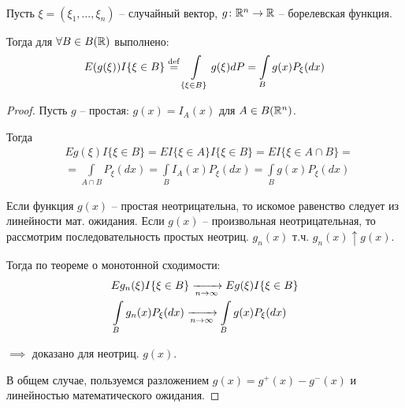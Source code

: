 \begin{theorem}~

  Пусть $\xi = (\xi_1, \ldots, \xi_n)$ -- случайный вектор, 
  $g\colon \mathbb{R}^n \to \mathbb{R}$ -- борелевская функция. 

  Тогда для $\forall B \in B(\mathbb{R})$ выполнено:
  \begin{align*}
    E(g(\xi)) I\{ \xi \in B \} \stackrel{\mathrm{def}}{=} \int\limits_{\{ \xi \in B \}} g(\xi) dP = 
    \int\limits_B g(x) P_{\xi} (dx)
  \end{align*}

  \begin{proof}
    Пусть $g$ -- простая: $g(x) = I_{A}(x)$ для $A \in B(\mathbb{R}^n)$.

    Тогда
    \begin{align*}
      &E g(\xi) I \{ \xi \in B \} = E I \{ \xi \in A \} I \{ \xi \in B \} =
      E I \{ \xi \in A \cap B \} = \\
      &= \int\limits_{A \cap B} P_{\xi} (dx) = \int\limits_{B} I_{A} (x) P_{\xi} (dx) 
      = \int\limits_B g(x) P_{\xi} (dx)
    \end{align*}

    Если функция $g(x)$ -- простая неотрицательна, 
    то искомое равенство следует из линейности мат. ожидания.
    Если $g(x)$ -- произвольная неотрицательная, 
    то рассмотрим последовательность простых неотриц. $g_n(x)$ т.ч. $g_n(x) \uparrow g(x)$.

    Тогда по теореме о монотонной сходимости:
    \begin{align*}
      &E g_n(\xi) I \{ \xi \in B \} \xrightarrow[n \to \infty]{} E g(\xi) I \{ \xi \in B \}\\
      &\int\limits_B g_n (x) P_{\xi} (dx) \xrightarrow[n \to \infty]{} \int\limits_B g(x) P_{\xi} (dx)
    \end{align*}

    $\implies$ доказано для неотриц. $g(x)$.

    В общем случае, пользуемся разложением $g(x) = g^+(x) - g^-(x)$ и линейностью математического ожидания.
  \end{proof}
\end{theorem}

